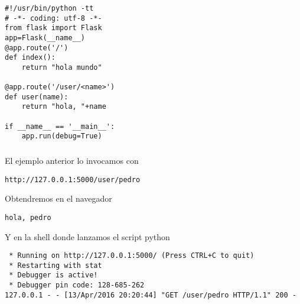 \documentclass[ucs]{beamer}
\begin{document}
\begin{frame}[fragile]
\frametitle{}

  \begin{footnotesize}
  \begin{verbatim}
#!/usr/bin/python -tt
# -*- coding: utf-8 -*-
from flask import Flask 
app=Flask(__name__)
@app.route('/')
def index():
    return "hola mundo"

@app.route('/user/<name>') 
def user(name):
    return "hola, "+name

if __name__ == '__main__': 
    app.run(debug=True)
  \end{verbatim}
  \end{footnotesize}

\end{frame}



\begin{frame}[fragile]
\frametitle{}
El ejemplo anterior lo invocamos con 
  \begin{footnotesize}
  \begin{verbatim}
http://127.0.0.1:5000/user/pedro
  \end{verbatim}
  \end{footnotesize}

Obtendremos en el navegador

  \begin{footnotesize}
  \begin{verbatim}
hola, pedro
  \end{verbatim}
  \end{footnotesize}

Y en la shell donde lanzamos el script python
  \begin{footnotesize}
  \begin{verbatim}
 * Running on http://127.0.0.1:5000/ (Press CTRL+C to quit)
 * Restarting with stat
 * Debugger is active!
 * Debugger pin code: 128-685-262
127.0.0.1 - - [13/Apr/2016 20:20:44] "GET /user/pedro HTTP/1.1" 200 -
  \end{verbatim}
  \end{footnotesize}

\end{frame}
\end{document}
